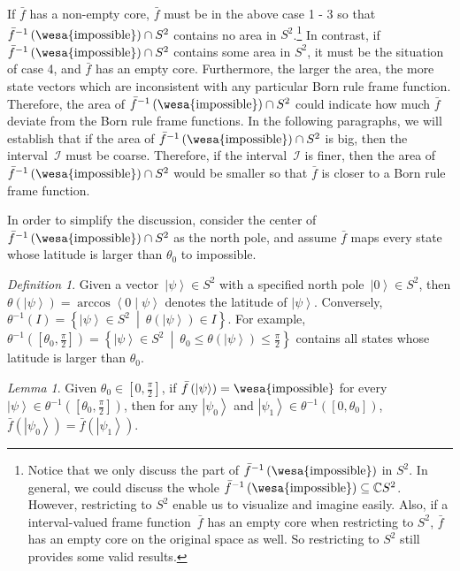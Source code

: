 \documentclass{article}
\theoremstyle{remark}
\newtheorem{definition}{Definition}
\newtheorem{lemma}{Lemma}
\newcommand{\imposs}{{\mbox{\wesa{impossible}}}}
\newcommand{\ket}[1]{{\left\vert{#1}\right\rangle}}
\newcommand{\ip}[2]{\ensuremath{\left\langle{#1}\middle\vert{#2}\right\rangle}}
\newcommand{\set}[2]{\ensuremath{\left\{ {#1}~\middle|~{#2}\right\} }}
\begin{document}
If $\bar{f}$ has a non-empty core, $\bar{f}$ must be in the above
case 1 - 3 so that $\bar{f}^{-1}\left(\imposs\right)\cap S^{2}$ contains
no area in $S^{2}$.\footnote{Notice that we only discuss the part of $\bar{f}^{-1}\left(\imposs\right)$
in $S^{2}$. In general, we could discuss the whole $\bar{f}^{-1}\left(\imposs\right)\subseteq\mathbb{C}S^{2}$.
However, restricting to $S^{2}$ enable us to visualize and imagine
easily. Also, if a interval-valued frame function~$\bar{f}$ has
an empty core when restricting to $S^{2}$, $\bar{f}$ has an empty
core on the original space as well. So restricting to $S^{2}$ still
provides some valid results.} In contrast, if $\bar{f}^{-1}\left(\imposs\right)\cap S^{2}$ contains
some area in $S^{2}$, it must be the situation of case 4, and $\bar{f}$
has an empty core. Furthermore, the larger the area, the more state
vectors which are inconsistent with any particular Born rule frame
function. Therefore, the area of $\bar{f}^{-1}\left(\imposs\right)\cap S^{2}$
could indicate how much $\bar{f}$ deviate from the Born rule frame
functions. In the following paragraphs, we will establish that if
the area of $\bar{f}^{-1}\left(\imposs\right)\cap S^{2}$ is big,
then the interval~$\mathscr{I}$ must be coarse. Therefore, if the
interval~$\mathscr{I}$ is finer, then the area of $\bar{f}^{-1}\left(\imposs\right)\cap S^{2}$
would be smaller so that $\bar{f}$ is closer to a Born rule frame
function.

In order to simplify the discussion, consider the center of $\bar{f}^{-1}\left(\imposs\right)\cap S^{2}$
as the north pole, and assume $\bar{f}$ maps every state whose latitude
is larger than $\theta_{0}$ to impossible.

\begin{definition}Given a vector~$\ket{\psi}\in S^{2}$ with a specified
north pole~$\ket{0}\in S^{2}$, then $\theta\left(\ket{\psi}\right)=\arccos\ip{0}{\psi}$
denotes the latitude of $\ket{\psi}$. Conversely, $\theta^{-1}\left(I\right)=\set{\ket{\psi}\in S^{2}}{\theta\left(\ket{\psi}\right)\in I}$.
For example, $\theta^{-1}\left(\left[\theta_{0},\frac{\pi}{2}\right]\right)=\set{\ket{\psi}\in S^{2}}{\theta_{0}\le\theta\left(\ket{\psi}\right)\le\frac{\pi}{2}}$
contains all states whose latitude is larger than $\theta_{0}$.\end{definition}

\begin{lemma}Given $\theta_{0}\in\left[0,\frac{\pi}{2}\right]$,
if $\bar{f}\left(\ket{\psi}\right)=\imposs$ for every $\ket{\psi}\in\theta^{-1}\left(\left[\theta_{0},\frac{\pi}{2}\right]\right)$,
then for any $\ket{\psi_{0}}$ and $\ket{\psi_{1}}\in\theta^{-1}\left(\left[0,\theta_{0}\right]\right)$,
$\bar{f}\left(\ket{\psi_{0}}\right)=\bar{f}\left(\ket{\psi_{1}}\right)$.\end{lemma}
\end{document}
